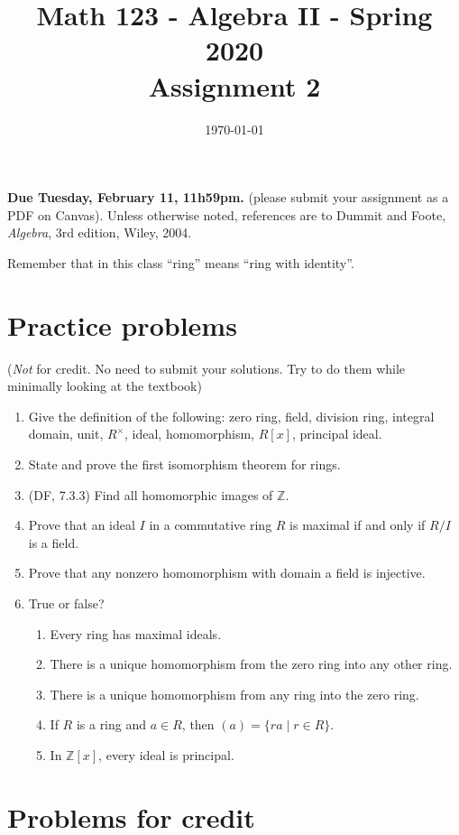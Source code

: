 \documentclass{amsart}
\title[Math 123, Spring 2020: assignment 2]{Math 123 - Algebra II - Spring 2020 \\ Assignment 2}
\date{\today}
\theoremstyle{definition}
\newcommand{\Zz}{\mathbb{Z}}
\begin{document}

\vspace*{-10em}
\maketitle

\textbf{Due Tuesday, February 11, 11h59pm.} (please submit your assignment as a PDF on Canvas). Unless otherwise noted, references are to Dummit and Foote, \emph{Algebra}, 3rd edition, Wiley, 2004.

Remember that in this class ``ring'' means ``ring with identity''.

\section*{Practice problems} (\emph{Not} for credit. No need to submit your solutions. Try to do them while minimally looking at the textbook)

\begin{enumerate}
\item Give the definition of the following: zero ring, field, division ring, integral domain, unit, $R^\times$,  ideal, homomorphism, $R[x]$, principal ideal.
\item State and prove the first isomorphism theorem for rings.
\item (DF, 7.3.3) Find all homomorphic images of $\Zz$.
\item Prove that an ideal $I$ in a commutative ring $R$ is maximal if and only if $R / I$ is a field.
\item Prove that any nonzero homomorphism with domain a field is injective.
\item True or false?
  \begin{enumerate}
  \item Every ring has maximal ideals.
  \item There is a unique homomorphism from the zero ring into any other ring.
  \item There is a unique homomorphism from any ring into the zero ring.
  \item If $R$ is a ring and $a \in R$, then $(a) = \{ra \mid r \in R\}$.
  \item In $\mathbb{Z}[x]$, every ideal is principal.
  \end{enumerate}
\end{enumerate}

\section*{Problems for credit}
\end{document}
